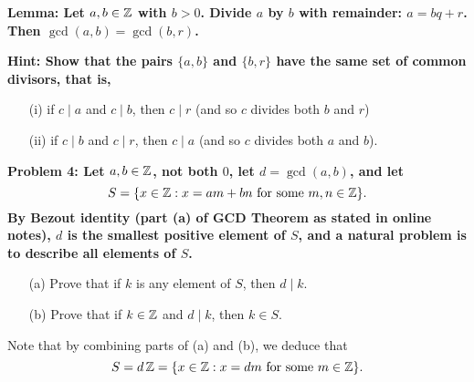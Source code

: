 \documentclass[11pt]{amsart}
\begin{document}
\bf{Lemma: }\rm Let $a,b\in{\mathbb Z}$ with $b>0$. Divide $a$ by $b$ with remainder: $a=bq+r$.
Then $\gcd(a,b)=\gcd(b,r)$.

\bf{Hint: }\rm Show that the pairs $\{a,b\}$ and $\{b,r\}$ have the same set of common divisors,
that is, 
\begin{itemize}
\item[(i)] if $c\mid a$ and $c\mid b$, then $c\mid r$ (and so $c$ divides both $b$ and $r$)
\item[(ii)] if $c\mid b$ and $c\mid r$, then $c\mid a$ (and so $c$ divides both $a$ and $b$).
\end{itemize}
\bf{Problem 4: }\rm Let $a,b\in{\mathbb Z}$, not both $0$, let $d=\gcd(a,b)$,
and let $$S=\{x\in {\mathbb Z}: x=am+bn\mbox{ for some }m,n\in{\mathbb Z}\}.$$ By Bezout identity (part (a) of GCD Theorem 
as stated in online notes), $d$ is the smallest positive element of $S$, and a natural problem is to describe
all elements of $S$.
\begin{itemize}
\item[(a)] Prove that if $k$ is any element of $S$, then $d\mid k$.
\item[(b)] Prove that if $k\in{\mathbb Z}$ and $d\mid k$, then $k\in S$. 
\end{itemize}
Note that by combining parts of (a) and (b), we deduce that 
$$S=d\,{\mathbb Z}=\{x\in{\mathbb Z}: x=dm \mbox { for some }m\in{\mathbb Z}\}.$$
\end{document}

